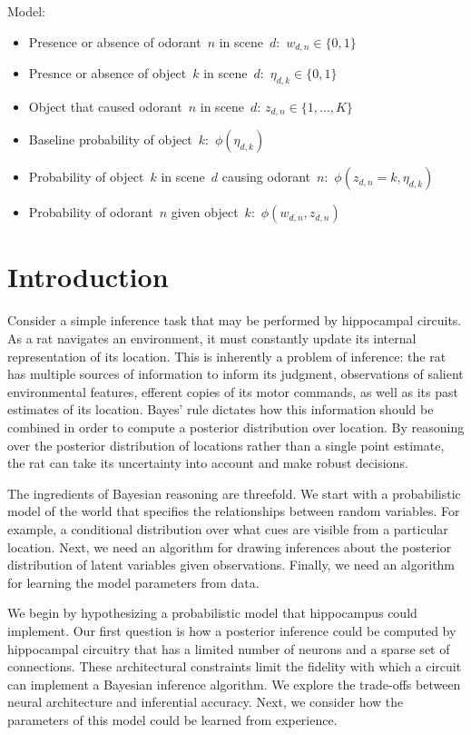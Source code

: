 Model:
\begin{itemize}
\item Presence or absence of odorant~$n$ in scene~$d$:~$w_{d,n} \in \{0,1\}$
\item Presnce or absence of object~$k$ in scene~$d$:~$\eta_{d,k} \in \{0,1\}$
\item Object that caused odorant~$n$ in scene~$d$: $z_{d,n} \in \{1, \ldots, K\}$ 
\item Baseline probability of object~$k$:~$\phi(\eta_{d,k})$
\item Probability of object~$k$ in scene~$d$ causing odorant~$n$:~$\phi(z_{d,n}=k, \eta_{d,k})$
\item Probability of odorant~$n$ given object~$k$:~$\phi(w_{d,n}, z_{d,n})$
\end{itemize}

\clearpage
\section{Introduction} 
Consider a simple inference task that may be performed by hippocampal circuits. 
As a rat navigates an environment, it must constantly update its internal 
representation of its location. This is inherently a problem of inference: 
the rat has multiple sources of information to inform its judgment, observations
of salient environmental features, efferent copies of its motor commands, as
well as its past estimates of its location. Bayes' rule dictates how this 
information should be combined in order to compute a posterior distribution 
over location. By reasoning over the posterior distribution of locations 
rather than a single point estimate, the rat can take its uncertainty into 
account and make robust decisions. 

The ingredients of Bayesian reasoning are threefold. We start with a 
probabilistic model of the world that specifies the relationships between
random variables. For example, a conditional distribution over what cues 
are visible from a particular location. Next, we need an algorithm for 
drawing inferences about the posterior distribution of latent variables 
given observations. Finally, we need an algorithm for learning the 
model parameters from data. 

We begin by hypothesizing a probabilistic model that hippocampus could implement.
Our first question is how a posterior inference could be computed by hippocampal 
circuitry that has a limited number of neurons and a sparse set of connections.
These architectural constraints limit the fidelity with which a circuit can 
implement a Bayesian inference algorithm. We explore the trade-offs between 
neural architecture and inferential accuracy. Next, we consider how the 
parameters of this model could be learned from experience.

